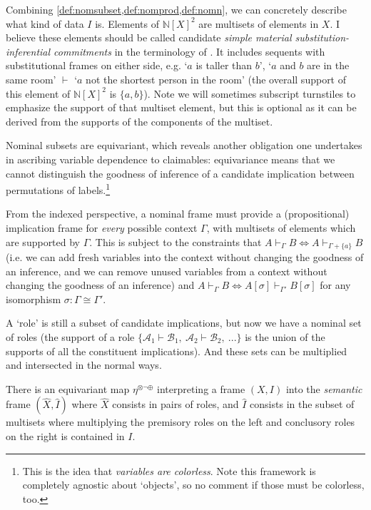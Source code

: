 \documentclass{article}
\theoremstyle{definition}
\newcommand{\N}{\mathbb{N}}
\newcommand{\cA}{\mathcal{A}}
\newcommand{\cB}{\mathcal{B}}
\begin{document}
Combining \cref{def:nomsubset,def:nomprod,def:nomn}, we can concretely describe what kind of data $I$ is. Elements of $\N[X]^2$ are multisets of elements in $X$. 
I believe these elements should be called candidate {\it simple material substitution-inferential commitments} in the terminology of \cite[Ch 6]{brandom1994making}. 
It includes sequents with substitutional frames on either side, e.g. `$a$ is taller than $b$', `$a$ and $b$ are in the same room' $\vdash$ `$a$ not the shortest person in the room' (the overall support of this element of $\N[X]^2$ is $\{a,b\}$). Note we will sometimes subscript turnstiles to emphasize the support of that multiset element, but this is optional as it can be derived from the supports of the components of the multiset.

Nominal subsets are equivariant, which reveals another obligation one undertakes in ascribing variable dependence to claimables: 
equivariance means that we cannot distinguish the goodness of inference of a candidate implication between permutations of labels.\footnote{
    This is the idea that {\it variables are colorless}. Note this framework is completely agnostic about `objects', so no comment if those must be colorless, too.}  

From the indexed perspective, a nominal frame must provide a (propositional) implication frame for {\it every} possible context $\Gamma$, with multisets of elements which are supported by $\Gamma$. 
This is subject to the constraints that  $A \vdash_\Gamma B \iff A \vdash_{\Gamma+\{a\}} B$ (i.e. we can add fresh variables into the context without changing the goodness of an inference, and we can remove unused variables from a context without changing the goodness of an inference) and $A \vdash_\Gamma B \iff A[\sigma]\vdash_{\Gamma'} B[\sigma]$ for any isomorphism $\sigma\colon\Gamma\cong \Gamma'$.

A `role' is still a subset of candidate implications, but now we have a nominal set of roles (the support of a role $\{\cA_1\vdash \cB_1,\ \cA_2\vdash \cB_2,\ ...\}$ is the union of the supports of all the constituent implications). 
And these sets can be multiplied and intersected in the normal ways.


There is an equivariant map $\eta^{\otimes\neg\oplus}$ interpreting a frame $(X,I)$ into the {\it semantic} frame $(\hat X,\hat I)$ where $\hat X$ consists in pairs of roles, and $\hat I$ consists in the subset of multisets where multiplying the premisory roles on the left and conclusory roles on the right is contained in $I$.
\end{document}
